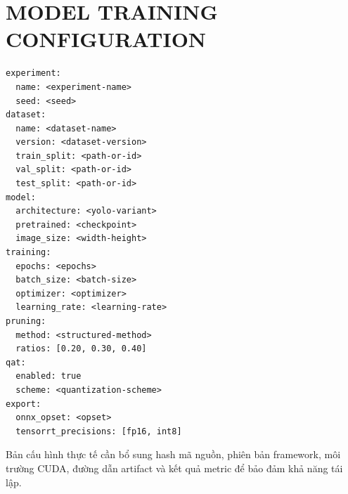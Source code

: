 \chapter{MODEL TRAINING CONFIGURATION}

\begin{lstlisting}[caption={Mẫu cấu hình huấn luyện và tối ưu cần lưu cùng run}]
experiment:
  name: <experiment-name>
  seed: <seed>
dataset:
  name: <dataset-name>
  version: <dataset-version>
  train_split: <path-or-id>
  val_split: <path-or-id>
  test_split: <path-or-id>
model:
  architecture: <yolo-variant>
  pretrained: <checkpoint>
  image_size: <width-height>
training:
  epochs: <epochs>
  batch_size: <batch-size>
  optimizer: <optimizer>
  learning_rate: <learning-rate>
pruning:
  method: <structured-method>
  ratios: [0.20, 0.30, 0.40]
qat:
  enabled: true
  scheme: <quantization-scheme>
export:
  onnx_opset: <opset>
  tensorrt_precisions: [fp16, int8]
\end{lstlisting}

Bản cấu hình thực tế cần bổ sung hash mã nguồn, phiên bản framework, môi trường
CUDA, đường dẫn artifact và kết quả metric để bảo đảm khả năng tái lập.